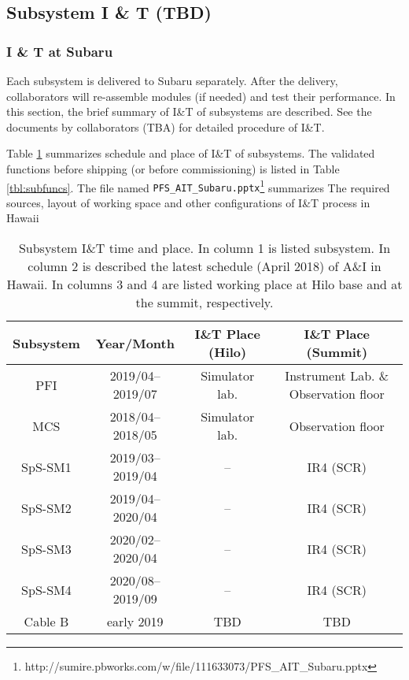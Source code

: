 \subsection{Subsystem I \& T (TBD)}
\subsubsection{I \& T at Subaru}
Each subsystem is delivered to Subaru separately.
After the delivery, collaborators will re-assemble modules (if needed) and test their performance.
In this section, the brief summary of I\&T of subsystems are described.
See the documents by collaborators (TBA) for detailed procedure of I\&T.

Table \ref{tbl:SubSysIandT} summarizes schedule and place of I\&T of subsystems.
The validated functions before shipping (or before commissioning) is listed in Table \ref{tbl:subfuncs}.
The file named {\tt PFS\_AIT\_Subaru.pptx}\footnote{http://sumire.pbworks.com/w/file/111633073/PFS\_AIT\_Subaru.pptx} summarizes The required sources, layout of working space and other configurations of I\&T process in Hawaii

\begin{table}[!ht]
\begin{center}
\caption{Subsystem I\&T time and place.
In column 1 is listed subsystem.
In column 2 is described the latest schedule (April 2018) of A\&I in Hawaii.
In columns 3 and 4 are listed working place at Hilo base and at the summit, respectively.
}
\label{tbl:SubSysIandT} 
\begin{tabular}{*{4}{c}} \hline
Subsystem	& Year/Month & I\&T Place (Hilo) & I\&T Place (Summit) \\ \hline \hline
PFI	& 2019/04--2019/07		& Simulator lab.	& Instrument Lab. \& Observation floor \\
MCS	& 2018/04--2018/05	& Simulator lab.	& Observation floor \\
SpS-SM1	& 2019/03--2019/04		& -- 	& IR4 (SCR) \\
SpS-SM2	& 2019/04--2020/04		& --	 	& IR4 (SCR) \\
SpS-SM3	& 2020/02--2020/04		& -- 	& IR4 (SCR) \\
SpS-SM4	& 2020/08--2019/09		& -- 	& IR4 (SCR) \\
Cable B	&	early 2019	& TBD	&TBD \\ \hline
\end{tabular} 
\end{center}
\end{table}

